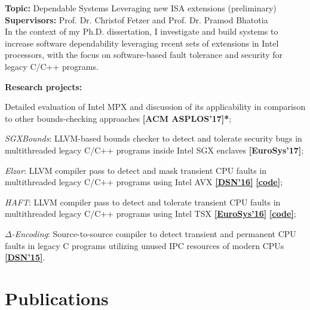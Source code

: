 \documentclass[letterpaper]{article}
\renewenvironment{itemize}{
  \begin{list}{}{
    \setlength{\leftmargin}{1.5em}
  }
}{
  \end{list}
}
\begin{document}
\begin{itemize}
\item {\bf Topic:} Dependable Systems Leveraging new ISA extensions (preliminary)\\
{\bf Supervisors:} Prof. Dr. Christof Fetzer and Prof. Dr. Pramod Bhatotia\vspace{-13pt}\\

In the context of my Ph.D. dissertation, I investigate and build systems to increase software dependability leveraging recent sets of extensions in Intel processors, with the focus on software-based fault tolerance and security for legacy C/C++ programs. %

{\bf Research projects:}
	\begin{itemize}%
		\item Detailed evaluation of Intel MPX and discussion of its applicability in comparison to other bounds-checking approaches {\bf [ACM ASPLOS'17]*};
		\item \emph{SGXBounds}: LLVM-based bounds checker to detect and tolerate security bugs in multithreaded legacy C/C++ programs inside Intel SGX enclaves {\bf [EuroSys'17]};
		\item \emph{Elzar}: LLVM compiler pass to detect and mask transient CPU faults in multithreaded legacy C/C++ programs using Intel AVX \href{http://se.inf.tu-dresden.de/pubs/papers/Kuvaiskii2016elzar.pdf}{{\bf [DSN'16]}} \href{https://github.com/tudinfse/elzar}{{\bf [code]}};
		\item \emph{HAFT}: LLVM compiler pass to detect and tolerate transient CPU faults in multithreaded legacy C/C++ programs using Intel TSX \href{http://se.inf.tu-dresden.de/pubs/papers/Kuvaiskii2016HAFT.pdf}{{\bf [EuroSys'16]}} \href{https://github.com/tudinfse/haft}{{\bf [code]}};
		\item \emph{$\Delta$-Encoding}: Source-to-source compiler to detect transient and permanent CPU faults in legacy C programs utilizing unused IPC resources of modern CPUs \href{http://se.inf.tu-dresden.de/pubs/papers/DELTAENC.pdf}{{\bf [DSN'15]}}.
	\end{itemize}%
\end{itemize}%


\section*{Publications}
\end{document}
